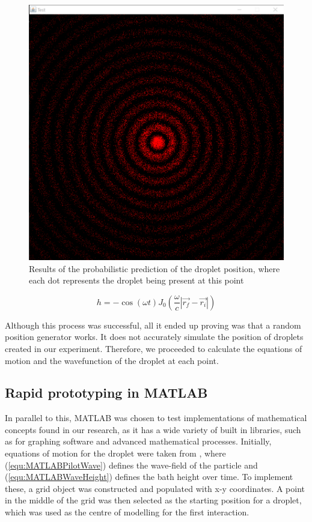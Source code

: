 \begin{figure}
\centering
\includegraphics[width=\textwidth]{simulation/probabiltyPosition.png}
\caption{Results of the probabilistic prediction of the droplet position, where each dot represents the droplet being present at this point}
\label{fig:probabilisticPrediction}
\end{figure}

\begin{equation}
    h = -\cos(\omega t) J_0(\frac{\omega}{c} |\vec{r_f}-\vec{r_i}|)
    \label{equ:probWaveEqn}
\end{equation}

Although this process was successful, all it ended up proving was that a random position generator works. It does not accurately simulate the position of droplets created in our experiment. Therefore, we proceeded to calculate the equations of motion and the wavefunction of the droplet at each point.

\subsection{Rapid prototyping in MATLAB}
In parallel to this, MATLAB was chosen to test implementations of mathematical concepts found in our research, as it has a wide variety of built in libraries, such as for graphing software and advanced mathematical processes. Initially, equations of motion for the droplet were taken from \cite{oza2013trajectory}, where (\ref{equ:MATLABPilotWave}) defines the wave-field of the particle and (\ref{equ:MATLABWaveHeight}) defines the bath height over time. To implement these, a grid object was constructed and populated with x-y coordinates. A point in the middle of the grid was then selected as the starting position for a droplet, which was used as the centre of modelling for the first interaction.

